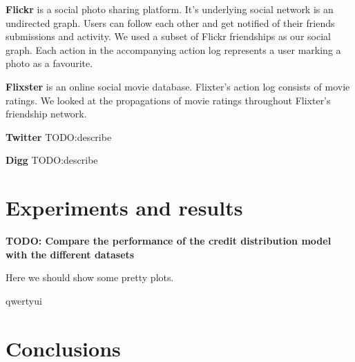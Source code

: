 \documentclass{acm_proc_article-sp}
\begin{document}
\textbf{Flickr} is a social photo sharing platform. It's underlying social network is an undirected graph. Users can follow each other and get notified of their friends submissions and activity. We used a subset of Flickr friendships as our social graph. Each action in the accompanying action log represents a user marking a photo as a favourite.

\textbf{Flixster} is an online social movie database. Flixter's action log consists of movie ratings. We looked at the propagations of movie ratings throughout Flixter's friendship network.

\textbf{Twitter} TODO:describe \cite{DBLP:journals/corr/abs-1202-3162}

\textbf{Digg} TODO:describe \cite{DBLP:journals/corr/abs-1202-3162}


 \cite{DBLP:journals/corr/abs-1202-3162}


\section{Experiments and results}
\textbf{TODO: Compare the performance of the credit distribution model with the different datasets}

Here we should show some pretty plots.


qwertyui

\section{Conclusions}


%

%

\balancecolumns
\end{document}
